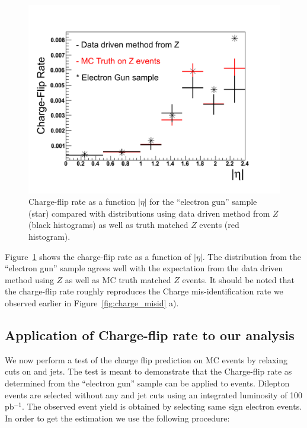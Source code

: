 \begin{figure}[htb]
\begin{center}
\includegraphics[width=0.7\linewidth]{figs/fr_rate.pdf}
\caption{Charge-flip rate as a function $|\eta|$ for the ``electron gun'' sample (star) compared with 
distributions using data driven method from $Z$ (black histograms) as well as truth matched $Z$ events 
(red histogram).\label{fig:charge_fliprate}}
\end{center}
\end{figure}

Figure~\ref{fig:charge_fliprate} shows the charge-flip rate as a function of $|\eta|$. The distribution from 
the ``electron gun'' sample agrees well with the expectation from the data driven method
using $Z$ as well as MC truth matched $Z$ events. It should be noted that the charge-flip rate roughly 
reproduces the Charge mis-identification rate we observed earlier in Figure~\ref{fig:charge_misid} a).

\subsection{Application of Charge-flip rate to our analysis}

We now perform a test of the charge flip prediction on \ttbar MC events by relaxing cuts on \met and jets. The test is meant
to demonstrate that the Charge-flip rate as determined from the ``electron gun'' sample can be applied
to \ttbar events. Dilepton events are selected without any \met and jet cuts using an integrated 
luminosity of 100 pb$^{-1}$. The observed event yield is obtained by selecting same sign electron events.
In order to get the estimation we use the following procedure:

